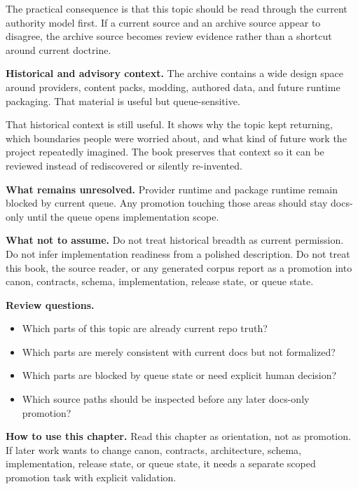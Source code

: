 \documentclass[10.5pt,a4paper,openany]{book}
\begin{document}
The practical consequence is that this topic should be read through the current authority model first.\allowbreak{} If a current source and an archive source appear to disagree, the archive source becomes review evidence rather than a shortcut around current doctrine.\allowbreak{}


\textbf{Historical and advisory context.} The archive contains a wide design space around providers, content packs, modding, authored data, and future runtime packaging.\allowbreak{} That material is useful but queue-\allowbreak{}sensitive.\allowbreak{}


That historical context is still useful.\allowbreak{} It shows why the topic kept returning, which boundaries people were worried about, and what kind of future work the project repeatedly imagined.\allowbreak{} The book preserves that context so it can be reviewed instead of rediscovered or silently re-\allowbreak{}invented.\allowbreak{}


\textbf{What remains unresolved.} Provider runtime and package runtime remain blocked by current queue.\allowbreak{} Any promotion touching those areas should stay docs-\allowbreak{}only until the queue opens implementation scope.\allowbreak{}


\textbf{What not to assume.} Do not treat historical breadth as current permission.\allowbreak{} Do not infer implementation readiness from a polished description.\allowbreak{} Do not treat this book, the source reader, or any generated corpus report as a promotion into canon, contracts, schema, implementation, release state, or queue state.\allowbreak{}


\textbf{Review questions.}


\begin{itemize}
\item Which parts of this topic are already current repo truth?
\item Which parts are merely consistent with current docs but not formalized?
\item Which parts are blocked by queue state or need explicit human decision?
\item Which source paths should be inspected before any later docs-\allowbreak{}only promotion?
\end{itemize}

\textbf{How to use this chapter.} Read this chapter as orientation, not as promotion.\allowbreak{} If later work wants to change canon, contracts, architecture, schema, implementation, release state, or queue state, it needs a separate scoped promotion task with explicit validation.\allowbreak{}
\end{document}
